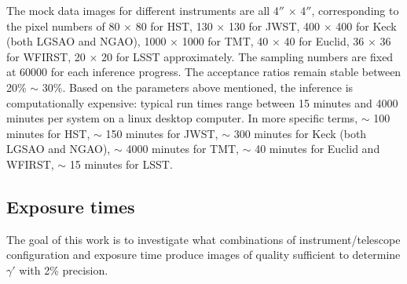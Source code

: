 \documentclass[a4paper,11pt]{article}
\begin{document}
%

The mock data images for different instruments are all 4$''$ $\times$
4$''$, corresponding to the pixel numbers of 80 $\times$ 80 for HST,
130 $\times$ 130 for JWST, 400 $\times$ 400 for Keck (both LGSAO and
NGAO), 1000 $\times$ 1000 for TMT, 40 $\times$ 40 for Euclid, 36
$\times$ 36 for WFIRST, 20 $\times$ 20 for LSST approximately. The sampling
numbers are fixed at 60000 for each inference progress.
The acceptance ratios remain stable between 20\% $\sim$ 30\%.
Based on the parameters above mentioned, the inference is computationally expensive: typical run times range
between 15 minutes and 4000 minutes per system on a
linux desktop computer. In more specific terms, $\sim$ 100 minutes for HST,
$\sim$ 150 minutes for JWST, $\sim$ 300 minutes for Keck (both LGSAO and NGAO),
$\sim$ 4000 minutes for TMT, $\sim$ 40 minutes for Euclid and WFIRST, $\sim$ 15 minutes for LSST.

\subsection{Exposure times}

The goal of this work is to investigate what combinations of
instrument/telescope configuration and exposure time produce images of
quality sufficient to determine $\gamma'$ with 2\% precision.
\end{document}
